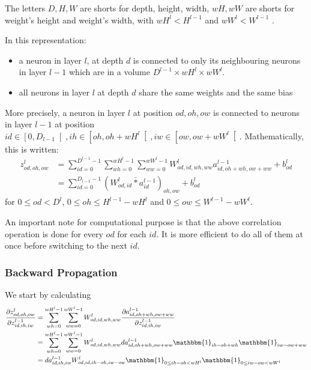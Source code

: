 \documentclass{article} %
\begin{document}
The letters $D, H, W$ are shorts for depth, height, width, $wH, wW$ are shorts for weight's height and weight's width, with $wH^l<H^{l-1}$ and $wW^l<W^{l-1}$ .

In this representation:
\begin{itemize}
\item a neuron in layer $l$, at depth $d$ is connected to only its neighbouring neurons in layer $l-1$ which are in a volume $D^{l-1}\times wH^l \times wW^l$. \item all neurons in layer $l$ at depth $d$ share the same weights and the same bias
\end{itemize}

More precisely, a neuron in layer $l$ at position $od, oh, ow$ is connected to neurons in layer $l-1$ at position  $id \in \left[0,D_{l-1}\right[, ih \in \left[oh, oh+wH^l \right[, iw \in \left[ow, ow+wW^l \right[$. Mathematically, this is written:
$$
\begin{aligned}
z^l_{od, oh, ow} 
&= \sum_{id=0}^{D^{l-1}-1} \sum_{wh=0}^{wH^l-1} \sum_{ww=0}^{wW^l-1} W^l_{od, id, wh, ww} a^{l-1}_{id, oh+wh, ow+ww} + b^l_{od}\\
&= \sum_{{id}=0}^{D_{l-1}-1} (W^l_{od, id} \bar{\ast} a^{l-1}_{id})_{oh, ow} + b^l_{od}
\end{aligned}
$$
for $0 \leq od < D^l$, $0 \leq oh \leq H^{l-1}-wH^l$ and $0 \leq ow \leq W^{l-1}-wW^l$.

An important note for computational purpose is that the above correlation operation is done for every $od$ for each $id$. It is more efficient to do all of them at once before switching to the next $id$.

\subsubsection{Backward Propagation}
We start by calculating
$$
\begin{aligned}
\frac{\partial z^l_{od, oh, ow}}{\partial z^{l-1}_{id, ih, iw}} 
&= \sum_{wh=0}^{wH^l-1} \sum_{ww=0}^{wW^l-1} W^l_{od, id, wh, ww} \frac{\partial a^{l-1}_{id, oh+wh, ow+ww} }{\partial z^{l-1}_{id, ih, iw}} \\
&= \sum_{wh=0}^{wH^l-1} \sum_{ww=0}^{wW^l-1} W^l_{od, id, wh, ww} da^{l-1}_{id, oh+wh, ow+ww} \mathbbm{1}_{ih=oh+wh}\mathbbm{1}_{iw=ow+ww} \\
&= da^{l-1}_{id, ih, iw} W^l_{od, id, ih-oh, iw-ow}  \mathbbm{1}_{0\leq ih-oh<wH^l}\mathbbm{1}_{0\leq  iw-ow<wW^l}
\end{aligned}
$$
\end{document}
